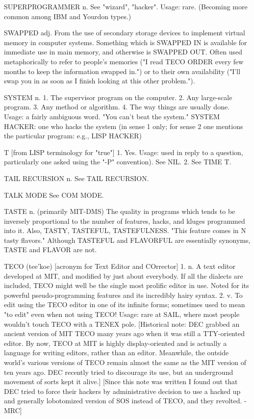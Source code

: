 SUPERPROGRAMMER n. See "wizard", "hacker".  Usage: rare.  (Becoming
   more common among IBM and Yourdon types.)

SWAPPED adj. From the use of secondary storage devices to implement
   virtual memory in computer systems.	Something which is SWAPPED IN
   is available for immediate use in main memory, and otherwise is
   SWAPPED OUT.	 Often used metaphorically to refer to people's
   memories ("I read TECO ORDER every few months to keep the
   information swapped in.") or to their own availability ("I'll swap
   you in as soon as I finish looking at this other problem.").

SYSTEM n. 1. The supervisor program on the computer.  2. Any
   large-scale program.	 3. Any method or algorithm.  4. The way
   things are usually done.  Usage: a fairly ambiguous word.  "You
   can't beat the system."
   SYSTEM HACKER: one who hacks the system (in sense 1 only; for sense
   2 one mentions the particular program: e.g., LISP HACKER)

T [from LISP terminology for "true"] 1. Yes.  Usage: used in reply to
   a question, particularly one asked using the "-P" convention).  See
   NIL.	 2. See TIME T.

TAIL RECURSION n. See TAIL RECURSION.

TALK MODE  See COM MODE.

TASTE n. (primarily MIT-DMS) The quality in programs which tends to be
   inversely proportional to the number of features, hacks, and kluges
   programmed into it.	Also, TASTY, TASTEFUL, TASTEFULNESS.  "This
   feature comes in N tasty flavors."  Although TASTEFUL and FLAVORFUL
   are essentially synonyms, TASTE and FLAVOR are not.

TECO (tee'koe) [acronym for Text Editor and COrrector] 1. n. A text
   editor developed at MIT, and modified by just about everybody.  If
   all the dialects are included, TECO might well be the single most
   prolific editor in use.  Noted for its powerful pseudo-programming
   features and its incredibly hairy syntax.  2. v. To edit using the
   TECO editor in one of its infinite forms; sometimes used to mean
   "to edit" even when not using TECO!	Usage: rare at SAIL, where
   most people wouldn't touch TECO with a TENEX pole.
   [Historical note: DEC grabbed an ancient version of MIT TECO many
   years ago when it was still a TTY-oriented editor.  By now, TECO at
   MIT is highly display-oriented and is actually a language for
   writing editors, rather than an editor.  Meanwhile, the outside
   world's various versions of TECO remain almost the same as the MIT
   version of ten years ago.  DEC recently tried to discourage its
   use, but an underground movement of sorts kept it alive.]
   [Since this note was written I found out that DEC tried to force
   their hackers by administrative decision to use a hacked up and
   generally lobotomized version of SOS instead of TECO, and they
   revolted. - MRC]

